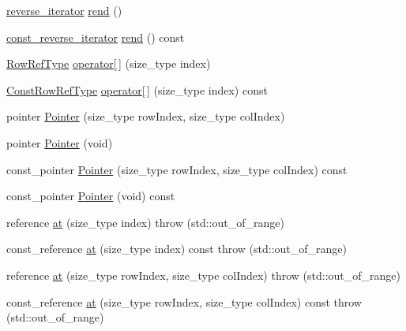 \begin{DoxyCompactItemize}
\hyperlink{classvct_fixed_size_const_matrix_base_a7611e666969b09bd846c46a1a85401b0}{reverse\+\_\+iterator} \hyperlink{classvct_fixed_size_matrix_base_a2554e19ff6668b7f6292e50939688f10}{rend} ()
\item 
\hyperlink{classvct_fixed_size_const_matrix_base_a86918b3da51e15dce72b62abdc6378fa}{const\+\_\+reverse\+\_\+iterator} \hyperlink{classvct_fixed_size_matrix_base_a433156cc1b2714e6400a005df46c6a0c}{rend} () const 
\item 
\hyperlink{classvct_fixed_size_const_matrix_base_a2ce1bc7d955f66d28462cb34b62d69b7}{Row\+Ref\+Type} \hyperlink{classvct_fixed_size_matrix_base_ac716ed964c34c1a66b887451f0610677}{operator\mbox{[}$\,$\mbox{]}} (size\+\_\+type index)
\item 
\hyperlink{classvct_fixed_size_const_matrix_base_a74355396eec7437755398c2810e0df41}{Const\+Row\+Ref\+Type} \hyperlink{classvct_fixed_size_matrix_base_ad4b55e1051d0ef6c679a1e48d36e35bd}{operator\mbox{[}$\,$\mbox{]}} (size\+\_\+type index) const 
\item 
pointer \hyperlink{classvct_fixed_size_matrix_base_a44b7f79714b2422d79c95fa501e06d71}{Pointer} (size\+\_\+type row\+Index, size\+\_\+type col\+Index)
\item 
pointer \hyperlink{classvct_fixed_size_matrix_base_a2fcaa16b221230011370f1db37735240}{Pointer} (void)
\item 
const\+\_\+pointer \hyperlink{classvct_fixed_size_matrix_base_a2389d0884f145f2e586f553782160aee}{Pointer} (size\+\_\+type row\+Index, size\+\_\+type col\+Index) const 
\item 
const\+\_\+pointer \hyperlink{classvct_fixed_size_matrix_base_ae617677119a399176af9296a827843b8}{Pointer} (void) const 
\item 
reference \hyperlink{classvct_fixed_size_matrix_base_abf94b9af49a3737c82c76056216c2767}{at} (size\+\_\+type index)  throw (std\+::out\+\_\+of\+\_\+range)
\item 
const\+\_\+reference \hyperlink{classvct_fixed_size_matrix_base_a7df412c941059d0f08155aaddb98df63}{at} (size\+\_\+type index) const   throw (std\+::out\+\_\+of\+\_\+range)
\item 
reference \hyperlink{classvct_fixed_size_matrix_base_a8e97883eb0ed9e92b94e339813312377}{at} (size\+\_\+type row\+Index, size\+\_\+type col\+Index)  throw (std\+::out\+\_\+of\+\_\+range)
\item 
const\+\_\+reference \hyperlink{classvct_fixed_size_matrix_base_a6c5a2adfefb508d4ac0904d6ba0754fd}{at} (size\+\_\+type row\+Index, size\+\_\+type col\+Index) const   throw (std\+::out\+\_\+of\+\_\+range)

\end{DoxyCompactItemize}
